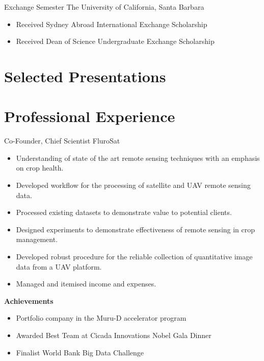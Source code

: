{Exchange Semester}
{The University of California, Santa Barbara}{}{}
{%
\begin{itemize}
  \item Received Sydney Abroad International Exchange Scholarship
  \item Received Dean of Science Undergraduate Exchange Scholarship
\end{itemize}
}

\nocite{*}
\printbibliography[title={Selected Publications}]

\section{Selected Presentations}


\section{Professional Experience}

{Co-Founder, Chief Scientist}
{FluroSat}{}{}
{%
  \begin{itemize}
    \item Understanding of state of the art remote sensing techniques with an emphasis on crop health.
    \item Developed workflow for the processing of satellite and UAV remote sensing data.
    \item Processed existing datasets to demonstrate value to potential clients.
    \item Designed experiments to demonstrate effectiveness of remote sensing in crop management.
    \item Developed robust procedure for the reliable collection of quantitative image data from a UAV platform.
    \item Managed and itemised income and expenses.
  \end{itemize}
  \textbf{Achievements}
  \begin{itemize}
    \item Portfolio company in the Muru-D accelerator program
    \item Awarded Best Team at Cicada Innovations Nobel Gala Dinner
    \item Finalist World Bank Big Data Challenge
  \end{itemize}
}
\vspace{1em}

